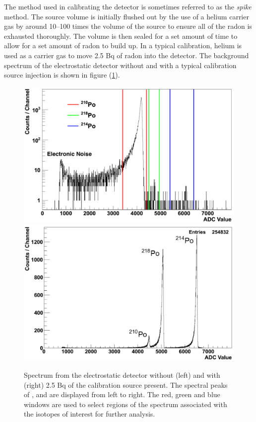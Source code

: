 The method used in calibrating the detector is sometimes referred to as the \textit{spike} method. The source volume is initially flushed out by the use of a helium carrier gas by around 10--100 times the volume of the source to ensure all of the radon is exhausted thoroughly. The volume is then sealed for a set amount of time to allow for a set amount of radon to build up. In a typical calibration, helium is used as a carrier gas to move 2.5 Bq of radon into the detector. The background spectrum of the electrostatic detector without and with a typical calibration source injection is shown in figure (\ref{fig:background_calibration_spectrum}). 
%
\begin{figure}[hb!]
    \centering
    \includegraphics[scale=0.23]{Chapter_4/Figures/background_spectra.png}
    \includegraphics[scale=0.28]{Chapter_4/Figures/calibration_spectra.png}
    \caption[Spectrum from the electrostatic detector without and with 2.5 Bq of the calibration present. The spectral peaks of \PoTOZ{}, \PoTOE{} and \PoTOF{} are displayed from left to right.]
    {Spectrum from the electrostatic detector without (left) and with (right) 2.5 Bq of the calibration source present. The spectral peaks of \PoTOZ{}, \PoTOE{} and \PoTOF{} are displayed from left to right. The red, green and blue windows are used to select regions of the spectrum associated with the isotopes of interest for further analysis.}
    \label{fig:background_calibration_spectrum}
\end{figure}
%

